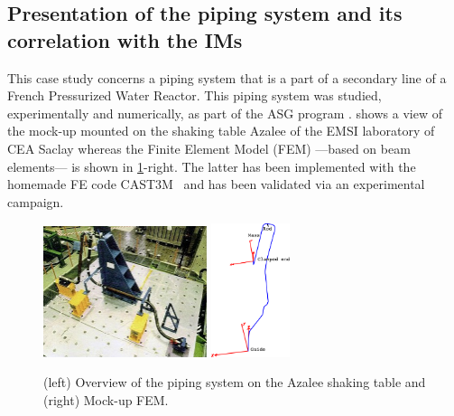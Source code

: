 \subsection{Presentation of the piping system and its correlation with the IMs}

This case study concerns a piping system that is a part of a secondary line of a French Pressurized Water Reactor. This piping system was studied, experimentally and numerically, as part of the ASG program \citep{touboul_seismic_1999}.   shows a view of the mock-up mounted on the shaking table Azalee of the EMSI laboratory of CEA Saclay whereas the Finite Element Model (FEM) ---based on beam elements--- is shown in \cref{uncIM:fig:ASG}-right. The latter has been implemented with the homemade FE code CAST3M~\citep{cea_cast3m_2019} and has been validated via  an experimental campaign.%

	\begin{figure}[!ht]
		\centering		
		\includegraphics[width=4.8cm]{figures/intro-frags/ASG.jpg}
		\hspace{1cm}
		\includegraphics[width=2.3cm]{figures/intro-frags/ASG_FEM.pdf}
		\caption{(left) Overview of the piping system on the Azalee shaking table and (right) Mock-up FEM.}
		 \label{uncIM:fig:ASG}
	\end{figure}

